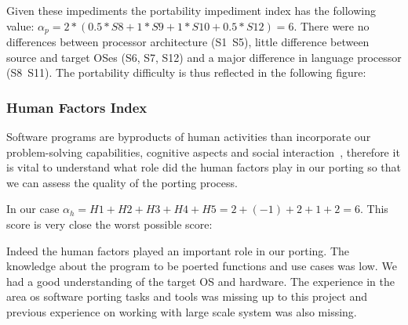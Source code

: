 Given these impediments the portability impediment index has the following
value: $\alpha_p = 2 * (0.5 * S8 + 1 * S9 + 1 * S10 + 0.5 * S12) = 6$.  There
were no differences between processor architecture (S1~S5), little difference
between source and target OSes (S6, S7, S12) and a major difference in language
processor (S8~S11). The portability difficulty is thus reflected in the
following figure:



\subsubsection{Human Factors Index}

Software programs are byproducts of human activities than incorporate our
problem-solving capabilities, cognitive aspects and social
interaction~\cite{b5}, therefore it is vital to understand what role did the
human factors play in our porting so that we can assess the quality of the
porting process. 

In our case $\alpha_h = H1 + H2 + H3 + H4 + H5 = 2 + (-1) + 2 + 1 + 2 = 6$.
This score is very close the worst possible score:


Indeed the human factors played an important role in our porting. The knowledge
about the program to be poerted functions and use cases was low. We had a good
understanding of the target OS and hardware. The experience in the area os
software porting tasks and tools was missing up to this project and previous
experience on working with large scale system was also missing.


